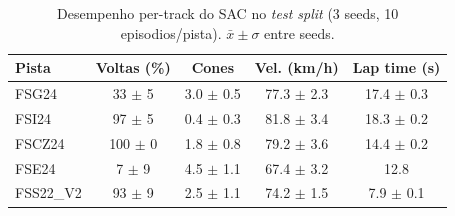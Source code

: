 \begin{table}[H]
\centering
\caption{Desempenho per-track do SAC no \textit{test split} (3 seeds, 10 episodios/pista). $\bar{x}\pm\sigma$ entre seeds.}
\label{tab:per_track_SAC}
\begin{tabular}{lcccc}
\toprule
\textbf{Pista} & \textbf{Voltas (\%)} & \textbf{Cones} & \textbf{Vel. (km/h)} & \textbf{Lap time (s)} \\
\midrule
FSG24 & 33 $\pm$ 5 & 3.0 $\pm$ 0.5 & 77.3 $\pm$ 2.3 & 17.4 $\pm$ 0.3 \\
FSI24 & 97 $\pm$ 5 & 0.4 $\pm$ 0.3 & 81.8 $\pm$ 3.4 & 18.3 $\pm$ 0.2 \\
FSCZ24 & 100 $\pm$ 0 & 1.8 $\pm$ 0.8 & 79.2 $\pm$ 3.6 & 14.4 $\pm$ 0.2 \\
FSE24 & 7 $\pm$ 9 & 4.5 $\pm$ 1.1 & 67.4 $\pm$ 3.2 & 12.8 \\
FSS22\_V2 & 93 $\pm$ 9 & 2.5 $\pm$ 1.1 & 74.2 $\pm$ 1.5 & 7.9 $\pm$ 0.1 \\
\bottomrule
\end{tabular}
\end{table}
